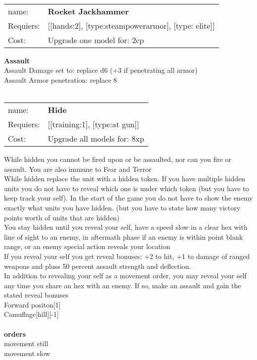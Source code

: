 \ \\
\begin{tabular}{ll}
name: & {\bf Rocket Jackhammer } \\
Requiers: & [[hands:2], [type:steampowerarmor], [type: elite]] \\
Cost: & Upgrade one model for: 2cp \\
\end{tabular}





{\bf Assault} \ \\
Assault Damage set to: replace d6 (+3 if penetrating all armor)
\\ 
Assault Armor penetration: replace 8 
\\ 




\ \\
\begin{tabular}{ll}
name: & {\bf Hide } \\
Requiers: & [[training:1], [type:at gun]] \\
Cost: & Upgrade all models for: 8xp \\
\end{tabular}

While hidden you cannot be fired upon or be assaulted, nor can you fire or assault. You are also immune to Fear and Terror\\ 
While hidden replace the unit with a hidden token. If you have multiple hidden units you do not have to reveal which one is under which token (but you have to keep track your self). In the start of the game you do not have to show the enemy exactly what units you have hidden. (but you have to state how many victory points worth of units that are hidden)\\ 
You stay hidden until you reveal your self, have a speed slow in a clear hex with line of sight to an enemy, in aftermath phase if an enemy is within point blank range, or an enemy special action reveals your location\\ 
If you reveal your self you get reveal bonuses: +2 to hit, +1 to damage of ranged weapons and pluss 50 percent assault strength and deflection.\\ 
In addition to revealing your self as a movement order, you may reveal your self any time you share an hex with an enemy. If so, make an assault and gain the stated reveal bonuses\\ 
Forward positon[1]\\ 
Camuflage[hill][-1]\\ 








\ \\ {\bf orders } \\
movement still \\
movement slow \\


